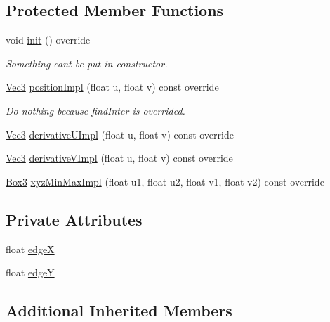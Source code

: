 \subsection*{Protected Member Functions}
\begin{DoxyCompactItemize}
\item 
void \hyperlink{classSquareXY_a9dfeebdb190f64c6085625e2dcf7d400}{init} () override
\begin{DoxyCompactList}\small\item\em Something can\textquotesingle{}t be put in constructor. \end{DoxyCompactList}\item 
\hyperlink{vec_8h_ae4fcaa7c0a3935930ed1be5f70b90373}{Vec3} \hyperlink{classSquareXY_a3d47992c4b73c6f49bade1c7e3fe05fe}{position\+Impl} (float u, float v) const override
\begin{DoxyCompactList}\small\item\em Do nothing because find\+Inter is overrided. \end{DoxyCompactList}\item 
\hyperlink{vec_8h_ae4fcaa7c0a3935930ed1be5f70b90373}{Vec3} \hyperlink{classSquareXY_a7507f187a31f589c06afe6dbcbccfe46}{derivative\+U\+Impl} (float u, float v) const override
\item 
\hyperlink{vec_8h_ae4fcaa7c0a3935930ed1be5f70b90373}{Vec3} \hyperlink{classSquareXY_a4803259cb98c12ba97eb9e8c57463b2d}{derivative\+V\+Impl} (float u, float v) const override
\item 
\hyperlink{structBox3}{Box3} \hyperlink{classSquareXY_ae03eb06fd6a8b493ebd1acbb0d22f365}{xyz\+Min\+Max\+Impl} (float u1, float u2, float v1, float v2) const override
\end{DoxyCompactItemize}
\subsection*{Private Attributes}
\begin{DoxyCompactItemize}
\item 
float \hyperlink{classSquareXY_abf2008e382a25547045a77c15339d465}{edgeX}
\item 
float \hyperlink{classSquareXY_a6ebaa2b3dffa23795ea2e887b3e5e0c1}{edgeY}
\end{DoxyCompactItemize}
\subsection*{Additional Inherited Members}


